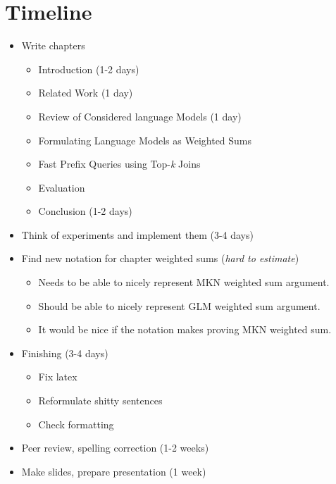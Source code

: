 \begin{landscape}
\begin{figure}[H]
{
    }
  \end{figure}
\end{landscape}

\chapter{Timeline}

\begin{itemize}
  \item Write chapters
    \begin{itemize}
      \item Introduction (1-2 days)
      \item Related Work (1 day)
      \item Review of Considered language Models (1 day)
      \item Formulating Language Models as Weighted Sums
      \item Fast Prefix Queries using Top-\emph{k} Joins
      \item Evaluation
      \item Conclusion (1-2 days)
    \end{itemize}
  \item Think of experiments and implement them (3-4 days)
  \item Find new notation for chapter weighted sums (\emph{hard to estimate})
    \begin{itemize}
      \item Needs to be able to nicely represent MKN weighted sum argument.
      \item Should be able to nicely represent GLM weighted sum argument.
      \item It would be nice if the notation makes proving MKN weighted sum.
    \end{itemize}
  \item Finishing (3-4 days)
    \begin{itemize}
      \item Fix latex
      \item Reformulate shitty sentences
      \item Check formatting
    \end{itemize}
  \item Peer review, spelling correction (1-2 weeks)
  \item Make slides, prepare presentation (1 week)
\end{itemize}

